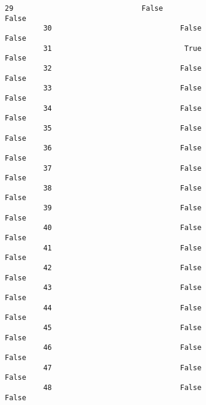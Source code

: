 \documentclass[11pt]{article}
\begin{document}
\begin{Verbatim}[commandchars=\\\{\}]
         29                              False                                  False   
         30                              False                                  False   
         31                               True                                  False   
         32                              False                                  False   
         33                              False                                  False   
         34                              False                                  False   
         35                              False                                  False   
         36                              False                                  False   
         37                              False                                  False   
         38                              False                                  False   
         39                              False                                  False   
         40                              False                                  False   
         41                              False                                  False   
         42                              False                                  False   
         43                              False                                  False   
         44                              False                                  False   
         45                              False                                  False   
         46                              False                                  False   
         47                              False                                  False   
         48                              False                                  False   
         

\end{Verbatim}
\end{document}
